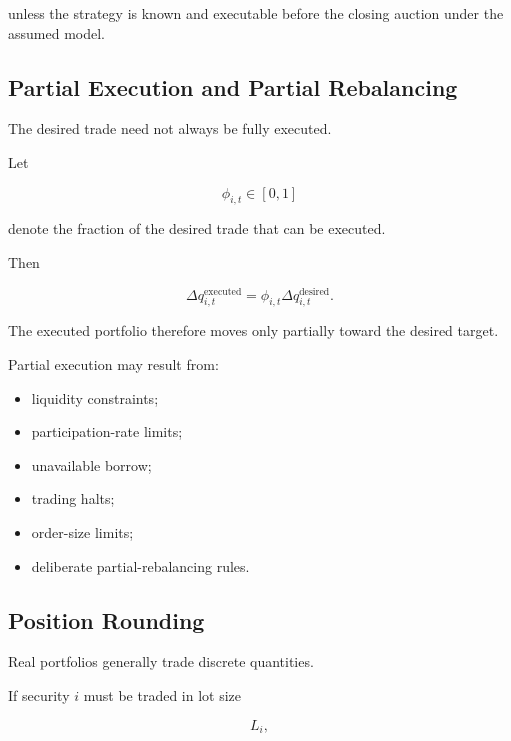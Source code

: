 \documentclass[11pt,a4paper]{article}
\begin{document}
unless the strategy is known and executable before the closing auction under the
assumed model.


\subsection{Partial Execution and Partial Rebalancing}

The desired trade need not always be fully executed.

Let

\begin{equation}
\phi_{i,t}
\in
[0,1]
\end{equation}

denote the fraction of the desired trade that can be executed.

Then

\begin{equation}
\boxed{
\Delta q_{i,t}^{\mathrm{executed}}
=
\phi_{i,t}
\Delta q_{i,t}^{\mathrm{desired}}.
}
\end{equation}

The executed portfolio therefore moves only partially toward the desired target.

Partial execution may result from:

\begin{itemize}
    \item liquidity constraints;
    \item participation-rate limits;
    \item unavailable borrow;
    \item trading halts;
    \item order-size limits;
    \item deliberate partial-rebalancing rules.
\end{itemize}


\subsection{Position Rounding}

Real portfolios generally trade discrete quantities.

If security $i$ must be traded in lot size

\begin{equation}
L_i,
\end{equation}
\end{document}
